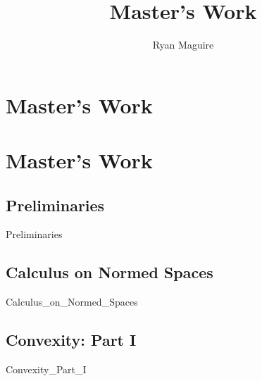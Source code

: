 \documentclass[crop=false,class=book,oneside]{standalone}
\begin{document}
    \newif\ifworkmasterswork
    \ifx\ifresearch\undefined
        \title{Master's Work}
        \author{Ryan Maguire}
        \date{\vspace{-5ex}}
        \maketitle
        \tableofcontents
        \clearpage
        \chapter*{Master's Work}
        \setcounter{chapter}{1}
    \else
        \chapter{Master's Work}
    \fi
    \section{Preliminaries}
        {Preliminaries}
    \section{Calculus on Normed Spaces}
        {Calculus_on_Normed_Spaces}
    \section{Convexity: Part I}
        {Convexity_Part_I}
\end{document}

